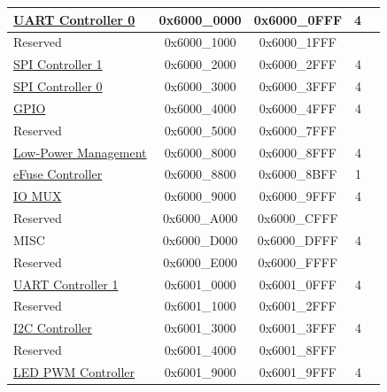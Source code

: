 \begin{longtable}[c]{ |p{5cm}|c|c|r|p{1.0cm}| }
		                \hyperref[mod:uart]{UART Controller 0}           & 0x6000\_0000 & 0x6000\_0FFF &   4    &   \\\hline
    \rowcolor{gray!25}  Reserved                    & 0x6000\_1000 & 0x6000\_1FFF &        &   \\\hline
                        \hyperref[mod:spi]{SPI Controller 1}            & 0x6000\_2000 & 0x6000\_2FFF &   4    &   \\\hline
                        \hyperref[mod:spi]{SPI Controller 0}            & 0x6000\_3000 & 0x6000\_3FFF &   4    &   \\\hline
                        \hyperref[mod:iomuxgpio]{GPIO}                    & 0x6000\_4000 & 0x6000\_4FFF &   4    &   \\\hline
    \rowcolor{gray!25}  Reserved                    & 0x6000\_5000 & 0x6000\_7FFF &        &   \\\hline
                        \hyperref[mod:lowpowm]{Low-Power Management}              & 0x6000\_8000 & 0x6000\_8FFF &   4    &   \\\hline
                        \hyperref[mod:efuse]{eFuse Controller}            & 0x6000\_8800 & 0x6000\_8BFF &   1    &   \\\hline
                        \hyperref[mod:iomuxgpio]{IO MUX}                  & 0x6000\_9000 & 0x6000\_9FFF &   4    &   \\\hline
    \rowcolor{gray!25}  Reserved                    & 0x6000\_A000 & 0x6000\_CFFF &        &   \\\hline
                        MISC                    & 0x6000\_D000 & 0x6000\_DFFF &   4    &   \\\hline
    \rowcolor{gray!25}  Reserved                    & 0x6000\_E000 & 0x6000\_FFFF &        &   \\\hline
                        \hyperref[mod:uart]{UART Controller 1}           & 0x6001\_0000 & 0x6001\_0FFF &   4    &   \\\hline
    \rowcolor{gray!25}  Reserved                    & 0x6001\_1000 & 0x6001\_2FFF &        &   \\\hline
                        \hyperref[mod:i2c]{I2C Controller}              & 0x6001\_3000 & 0x6001\_3FFF &   4    &   \\\hline
    \rowcolor{gray!25}  Reserved                    & 0x6001\_4000 & 0x6001\_8FFF &        &   \\\hline
                        \hyperref[mod:ledpwm]{LED PWM Controller}          & 0x6001\_9000 & 0x6001\_9FFF &   4    &   \\\hline

\end{longtable}
